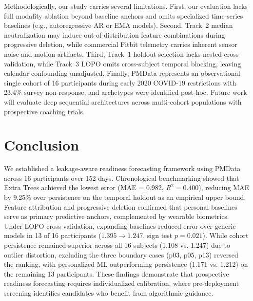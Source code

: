 \documentclass[runningheads]{llncs}
\begin{document}
Methodologically, our study carries several limitations. First, our evaluation lacks full modality ablation beyond baseline anchors and omits specialized time-series baselines (e.g., autoregressive AR or EMA models). Second, Track~2 median neutralization may induce out-of-distribution feature combinations during progressive deletion, while commercial Fitbit telemetry carries inherent sensor noise and motion artifacts. Third, Track~1 holdout selection lacks nested cross-validation, while Track~3 LOPO omits cross-subject temporal blocking, leaving calendar confounding unadjusted. Finally, PMData represents an observational single cohort of 16 participants during early 2020 COVID-19 restrictions with 23.4\% survey non-response, and archetypes were identified post-hoc. Future work will evaluate deep sequential architectures across multi-cohort populations with prospective coaching trials.

\section{Conclusion}
We established a leakage-aware readiness forecasting framework using PMData across 16 participants over 152 days. Chronological benchmarking showed that Extra Trees achieved the lowest error (MAE = 0.982, $R^2 = 0.400$), reducing MAE by 9.25\% over persistence on the temporal holdout as an empirical upper bound. Feature attribution and progressive deletion confirmed that personal baselines serve as primary predictive anchors, complemented by wearable biometrics. Under LOPO cross-validation, expanding baselines reduced error over generic models in 13 of 16 participants ($1.395 \to 1.247$, sign test $p = 0.021$). While cohort persistence remained superior across all 16 subjects (1.108 vs. 1.247) due to outlier distortion, excluding the three boundary cases (p03, p05, p13) reversed the ranking, with personalized ML outperforming persistence (1.171 vs. 1.212) on the remaining 13 participants. These findings demonstrate that prospective readiness forecasting requires individualized calibration, where pre-deployment screening identifies candidates who benefit from algorithmic guidance.

\clearpage
\begingroup
\renewcommand{\textbf}[1]{#1}
\small
\let\oldthebibliography\thebibliography
\renewcommand{\thebibliography}[1]{%
  \oldthebibliography{#1}%
  \setlength{\itemsep}{0pt plus 0.2pt}%
  \setlength{\parskip}{0pt}%
}


\endgroup
\end{document}
